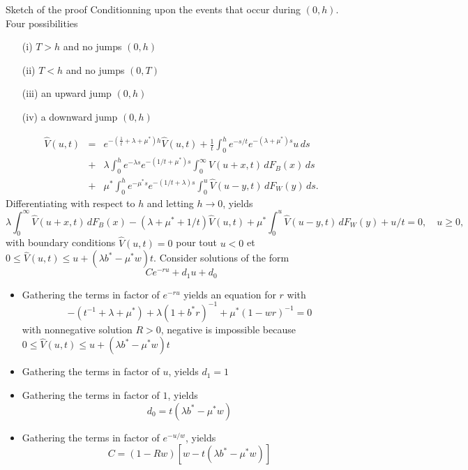 \documentclass{beamer}
\def \w{\widehat}
\begin{document}
\begin{frame}[allowframebreaks]{Sketch of the proof}
\scriptsize
Conditionning upon the events that occur during $(0,h)$. Four possibilities
\begin{itemize}
  \item[(i)] $T>h$ and no jumps $(0,h)$
  \item[(ii)] $T<h$ and no jumps $(0,T)$
  \item[(iii)] an upward jump $(0,h)$
  \item[(iv)] a downward jump $(0,h)$
\end{itemize}
  \begin{eqnarray*}\label{neu0}
      \w{V}(u,t)&=& e^{-(\frac{1}{t}+\lambda+\mu^\ast)h}\w{V}(u,t) + \frac{1}{t}\int_0^h e^{-{s}/{t}}e^{-(\lambda +\mu^\ast) s} u\,ds\\
      & +& \lambda\int_0^he^{-\lambda s} e^{-({1}/{t}+\mu^\ast) s} \int_0^\infty\w{V}(u+x,t)\,dF_{B}(x)\,ds\\
      &  +&\mu^\ast \int_0^he^{-\mu^\ast s} e^{-({1}/{t}+\lambda) s}\int_0^u \w{V}(u-y,t) \,dF_W(y)\,ds.
  \end{eqnarray*}
  Differentiating with respect to $h$ and letting $h\rightarrow 0$, yields
  \begin{equation} \label{inteq}
    \lambda\int_0^\infty\w{V}(u+x,t)\,dF_{B}(x)-(\lambda+\mu^\ast+{1}/{t})\w{V}(u,t)+\mu^\ast\int_0^u \w{V}(u-y,t) \,dF_W(y)+{u}/{t}=0,\quad u\ge 0,
  \end{equation}
  with boundary conditions $\w{V}(u,t)=0$ pour tout $u<0$ et $0\leq\w{V}(u,t)\leq u+(\lambda b^\ast - \mu^\ast w)t$. Consider solutions of the form
  $$
  Ce^{-ru}+d_1u+d_0
  $$
  \begin{itemize}
    \item Gathering the terms in factor of $e^{-r u}$ yields an equation for $r$ with
    $$
    -(t^{-1}+\lambda+\mu^\ast)+\lambda(1+b^\ast r)^{-1}+\mu^\ast(1-wr)^{-1}=0
    $$
    with nonnegative solution $R>0$, negative is impossible because $0\leq\w{V}(u,t)\leq u+(\lambda b^\ast - \mu^\ast w)t$
    \item Gathering the terms in factor of $u$, yields $d_1 = 1$
    \item Gathering the terms in factor of $1$, yields
    $$
    d_0 = t(\lambda b^\ast-\mu^\ast w)
    $$
    \item Gathering the terms in factor of $e^{-u/w}$, yields
    $$
    C = (1 - Rw)[w-t(\lambda b^\ast-\mu^\ast w)]
    $$
  \end{itemize}
\end{frame}
\end{document}
